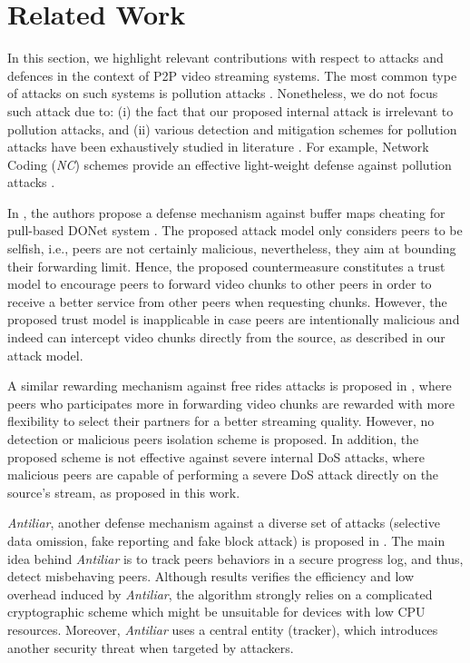 \section{Related Work}
\label{sec:related}

In this section, we highlight relevant contributions with respect to attacks and defences in the context of P2P video streaming systems.
The most common type of attacks on such systems is pollution attacks \cite{pollution1}. 
Nonetheless, we do not focus such attack due to: (i) the fact that our proposed internal attack is irrelevant to pollution attacks, and (ii) various detection and mitigation schemes for pollution attacks have been exhaustively studied in literature \cite{pollution2}.
For example, Network Coding (\textit{NC}) schemes provide an effective light-weight defense against pollution attacks \cite{nc}.

In \cite{defending}, the authors propose a defense mechanism against buffer maps cheating for pull-based DONet system \cite{zhang2005coolstreaming}.
The proposed attack model only considers peers to be selfish, i.e., peers are not certainly malicious, nevertheless, they aim at bounding their forwarding limit.
Hence, the proposed countermeasure constitutes a trust model to encourage peers to forward video chunks to other peers in order to receive a better service from other peers when requesting chunks.
However, the proposed trust model is inapplicable in case peers are intentionally malicious and indeed can intercept video chunks directly from the source, as described in our attack model.

A similar rewarding mechanism against free rides attacks is proposed in \cite{defending2}, where peers who participates more in forwarding video chunks are rewarded with more flexibility to select their partners for a better streaming quality.
However, no detection or malicious peers isolation scheme is proposed. 
In addition, the proposed scheme is not effective against severe internal DoS attacks, where malicious peers are capable of performing a severe DoS attack directly on the source's stream, as proposed in this work.

\textit{Antiliar}, another defense mechanism against a diverse set of attacks (selective data omission, fake reporting and fake block attack) is proposed in \cite{antiliar}.
The main idea behind \textit{Antiliar} is to track peers behaviors in a secure progress log, and thus, detect misbehaving peers.
Although results verifies the efficiency and low overhead induced by \textit{Antiliar}, the algorithm strongly relies on a complicated cryptographic scheme which might be unsuitable for devices with low CPU resources.
Moreover, \textit{Antiliar} uses a central entity (tracker), which introduces another security threat when targeted by attackers.

